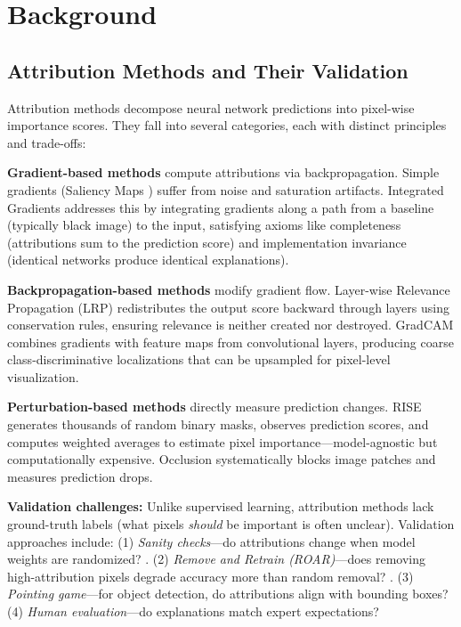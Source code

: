 \documentclass[11pt]{article}
\begin{document}
\section{Background}

\subsection{Attribution Methods and Their Validation}

Attribution methods decompose neural network predictions into pixel-wise importance scores. They fall into several categories, each with distinct principles and trade-offs:

\textbf{Gradient-based methods} compute attributions via backpropagation. Simple gradients (Saliency Maps \cite{simonyan2013deep}) suffer from noise and saturation artifacts. Integrated Gradients \cite{sundararajan2017axiomatic} addresses this by integrating gradients along a path from a baseline (typically black image) to the input, satisfying axioms like completeness (attributions sum to the prediction score) and implementation invariance (identical networks produce identical explanations).

\textbf{Backpropagation-based methods} modify gradient flow. Layer-wise Relevance Propagation (LRP) \cite{bach2015pixel} redistributes the output score backward through layers using conservation rules, ensuring relevance is neither created nor destroyed. GradCAM \cite{selvaraju2017grad} combines gradients with feature maps from convolutional layers, producing coarse class-discriminative localizations that can be upsampled for pixel-level visualization.

\textbf{Perturbation-based methods} directly measure prediction changes. RISE \cite{petsiuk2018rise} generates thousands of random binary masks, observes prediction scores, and computes weighted averages to estimate pixel importance—model-agnostic but computationally expensive. Occlusion \cite{zeiler2014visualizing} systematically blocks image patches and measures prediction drops.

\textbf{Validation challenges:} Unlike supervised learning, attribution methods lack ground-truth labels (what pixels \textit{should} be important is often unclear). Validation approaches include: (1) \textit{Sanity checks}—do attributions change when model weights are randomized? \cite{adebayo2018sanity}. (2) \textit{Remove and Retrain (ROAR)}—does removing high-attribution pixels degrade accuracy more than random removal? \cite{hooker2019benchmark}. (3) \textit{Pointing game}—for object detection, do attributions align with bounding boxes? (4) \textit{Human evaluation}—do explanations match expert expectations?
\end{document}

